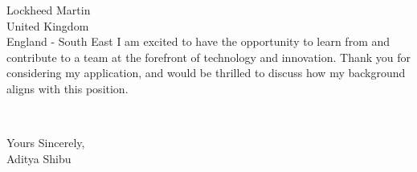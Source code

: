 \documentclass{letter}
\begin{document}
\begin{letter}{Lockheed Martin \\ United Kingdom \\ England - South East}
I am excited to have the opportunity to learn from and contribute to a team at the forefront of technology and innovation. Thank you for considering my application, and would be thrilled to discuss how my background aligns with this position.

\closing{~}

Yours Sincerely,\\[2mm]
Aditya Shibu

\end{letter}
\end{document}
